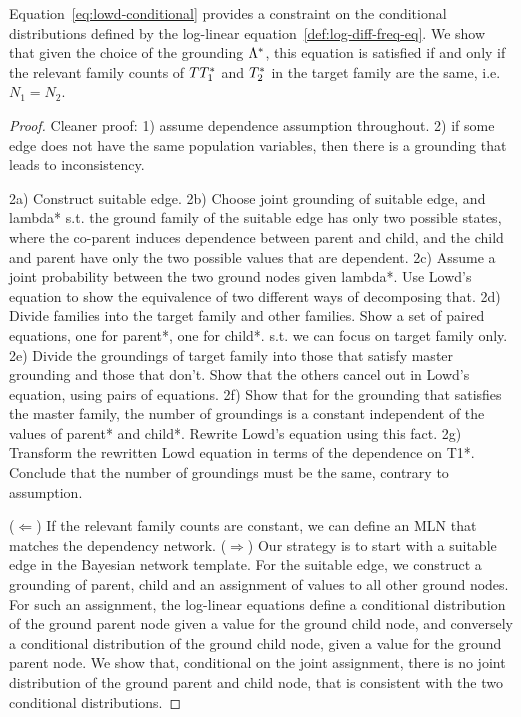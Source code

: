 \documentclass[runningheads,a4paper]{llncs}
\begin{document}
Equation~\eqref{eq:lowd-conditional} provides a constraint on the conditional distributions defined by the log-linear equation~\eqref{def:log-diff-freq-eq}. We show that given the choice of the grounding $\Lambda^{*}\hspace{0.0ex}$, this equation is satisfied if and only if the relevant family counts of $TT_{1}^{*}\hspace{0.0ex}$ and $T_{2}^{*}\hspace{0.0ex}$ in the target family are the same, i.e. $N_{1} = N_{2}$. 


\begin{proof}
Cleaner proof: 1) assume dependence assumption throughout. 2) if some edge does not have the same population variables, then there is a grounding that leads to inconsistency. 

2a) Construct suitable edge.
2b) Choose joint grounding of suitable edge, and lambda* s.t. the ground family of the suitable edge has only two possible states, where the co-parent induces dependence between parent and child, and the child and parent have only the two possible values that are dependent.
2c) Assume a joint probability between the two ground nodes given lambda*. Use Lowd's equation to show the equivalence of two different ways of decomposing that. 
2d) Divide families into the target family and other families. Show a set of paired equations, one for parent*, one for child*. s.t. we can focus on target family only.
2e) Divide the groundings of target family into those that satisfy master grounding and those that don't. Show that the others cancel out in Lowd's equation, using pairs of equations.
2f) Show that for the grounding that satisfies the master family, the number of groundings is a constant independent of the values of parent* and child*. Rewrite Lowd's equation using this fact.
2g) Transform the rewritten Lowd equation in terms of the dependence on T1*. Conclude that the number of groundings must be the same, contrary to assumption.

($\Leftarrow$) If the relevant family counts are constant, we can define an MLN that matches the dependency network.
($\Rightarrow$) Our strategy is to start with a suitable edge in the Bayesian network template. For the suitable edge, we construct a grounding of parent, child and an assignment of values to all other ground nodes. For such an assignment, the log-linear equations define a conditional distribution of the ground parent node given a value for the ground child node, and conversely a conditional distribution of the ground child node, given a value for the ground parent node. We show that, conditional on the joint assignment, there is no joint distribution of the ground parent and child node, that is consistent with the two conditional distributions. 


\end{proof}
\end{document}
